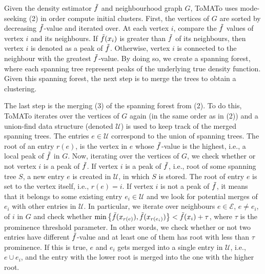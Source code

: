 Given the density estimator $\Tilde{f}$ and neighbourhood graph $G$, ToMATo uses mode-seeking (2) in order compute initial clusters. First, the vertices of $G$ are sorted by decreasing $\Tilde{f}$-value and iterated over. At each vertex $i$, compare the $\Tilde{f}$ values of vertex $i$ and its neighbours. If $\Tilde{f}(x_i)$ is greater than $\Tilde{f}$ of its neighbours, then vertex $i$ is denoted as a peak of $\Tilde{f}$. Otherwise, vertex $i$ is connected to the neighbour with the greatest  $\Tilde{f}$-value. By doing so, we create a spanning forest, where each spanning tree represent peaks of the underlying true density function. Given this spanning forest, the next step is to merge the trees to obtain a clustering.

The last step is the merging (3) of the spanning forest from (2). To do this, ToMATo iterates over the vertices of $G$ again (in the same order as in (2)) and a union-find data structure (denoted $\mathcal{U}$) is used to keep track of the merged spanning trees. The entries $e \in \mathcal{U}$ correspond to the union of spanning trees. The root of an entry $r(e)$, is the vertex in $e$ whose $\Tilde{f}$-value is the highest, i.e., a local peak of $\Tilde{f}$ in $G$. Now, iterating over the vertices of $G$, we check whether or not vertex $i$ is a peak of $\Tilde{f}$. If vertex $i$ is a peak of $\Tilde{f}$, i.e., root of some spanning tree $S$, a new entry $e$ is created in $\mathcal{U}$, in which $S$ is stored. The root of entry $e$ is set to the vertex itself, i.e., $r(e) = i$. If vertex $i$ is not a peak of $\Tilde{f}$, it means that it belongs to some existing entry $e_i \in \mathcal{U}$ and we look for potential merges of $e_i$ with other entries in $\mathcal{U}$. In particular, we iterate over neighbours $e \in \mathcal{E}$, $e \neq e_i$, of $i$ in $G$ and check whether $\min \left\{ \Tilde{f}(x_{r(e)}), \Tilde{f}(x_{r(e_i)}) \right\} < \Tilde{f}(x_i) + \tau$, where $\tau$ is the prominence threshold parameter. In other words, we check whether or not two entries have different $\Tilde{f}$-value and at least one of them has root with less than $\tau$ prominence. If this is true, $e$ and $e_i$ gets merged into a single entry in $\mathcal{U}$, i.e., $e \cup e_i$, and the entry with the lower root is merged into the one with the higher root.

